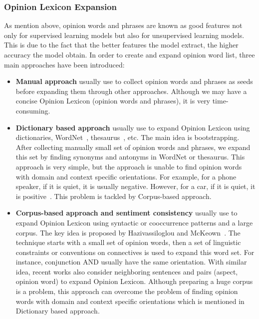 \documentclass{article}
\begin{document}
\subsubsection{Opinion Lexicon Expansion}
As mention above, opinion words and phrases are known as good features not only for supervised learning models but also for unsupervised learning models.
This is due to the fact that the better features the model extract, the higher accuracy the model obtain.
In order to create and expand opinion word list, three main approaches have been introduced:
\begin{itemize}
    \item \textbf{Manual approach} usually use to collect opinion words and phrases as seeds before expanding them through other approaches. Although we may have a concise Opinion Lexicon (opinion words and phrases), it is very time-consuming.
    \item \textbf{Dictionary based approach} usually use to expand Opinion Lexicon using dictionaries, WordNet~\cite{Miller90wordnet:an}, thesaurus~\cite{Mohammad:2009:GHS:1699571.1699591}, etc.
         The main idea is bootstrapping. 
         After collecting manually small set of opinion words and phrases, we expand this set by finding synonyms and antonyms in WordNet or thesaurus. 
         This approach is very simple, but the approach is unable to find opinion words with domain and context specific orientations. For example, for a  phone speaker, if it is quiet, it is usually negative. 
         However, for a car, if it is quiet, it is positive~\cite{Liu2012}. This problem is tackled by Corpus-based approach.
    \item \textbf{Corpus-based approach and sentiment consistency} usually use to expand Opinion Lexicon using syntactic or cooccurrence patterns and a large corpus. 
        The key idea is proposed by Hazivassiloglou and McKeown~\cite{Hatzivassiloglou:1997:PSO:976909.979640}. 
        The technique starts with a small set of opinion words, then a set of linguistic constraints or conventions on connectives is used to expand this word set. 
        For instance, conjunction AND usually have the same orientation. 
        With similar idea, recent works also consider neighboring sentences and pairs (aspect, opinion word) to expand Opinion Lexicon. 
        Although preparing a huge corpus is a problem, this approach can overcome the problem of finding opinion words with domain and context specific orientations which is mentioned in Dictionary based approach.
\end{itemize}
\end{document}
